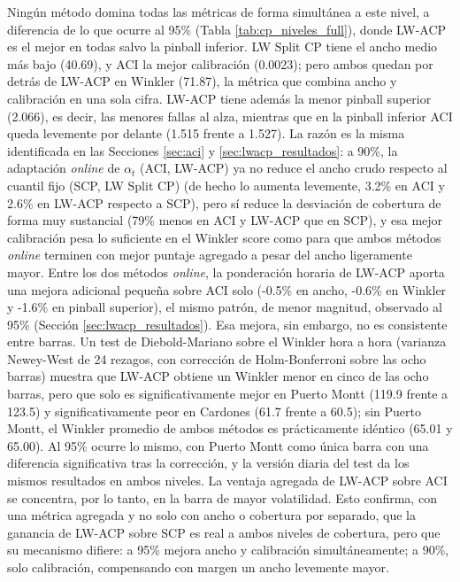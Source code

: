 Ningún método domina todas las métricas de forma simultánea a este nivel, a diferencia de lo que ocurre al 95\% (Tabla \ref{tab:cp_niveles_full}), donde LW-ACP es el mejor en todas salvo la pinball inferior. LW Split CP tiene el ancho medio más bajo (40.69), y ACI la mejor calibración (0.0023); pero ambos quedan por detrás de LW-ACP en Winkler (71.87), la métrica que combina ancho y calibración en una sola cifra. LW-ACP tiene además la menor pinball superior (2.066), es decir, las menores fallas al alza, mientras que en la pinball inferior ACI queda levemente por delante (1.515 frente a 1.527). La razón es la misma identificada en las Secciones \ref{sec:aci} y \ref{sec:lwacp_resultados}: a 90\%, la adaptación \textit{online} de $\alpha_t$ (ACI, LW-ACP) ya no reduce el ancho crudo respecto al cuantil fijo (SCP, LW Split CP) (de hecho lo aumenta levemente, 3.2\% en ACI y 2.6\% en LW-ACP respecto a SCP), pero sí reduce la desviación de cobertura de forma muy sustancial (79\% menos en ACI y LW-ACP que en SCP), y esa mejor calibración pesa lo suficiente en el Winkler score como para que ambos métodos \textit{online} terminen con mejor puntaje agregado a pesar del ancho ligeramente mayor. Entre los dos métodos \textit{online}, la ponderación horaria de LW-ACP aporta una mejora adicional pequeña sobre ACI solo (-0.5\% en ancho, -0.6\% en Winkler y -1.6\% en pinball superior), el mismo patrón, de menor magnitud, observado al 95\% (Sección \ref{sec:lwacp_resultados}). Esa mejora, sin embargo, no es consistente entre barras. Un test de Diebold-Mariano sobre el Winkler hora a hora (varianza Newey-West de 24 rezagos, con corrección de Holm-Bonferroni sobre las ocho barras) muestra que LW-ACP obtiene un Winkler menor en cinco de las ocho barras, pero que solo es significativamente mejor en Puerto Montt (119.9 frente a 123.5) y significativamente peor en Cardones (61.7 frente a 60.5); sin Puerto Montt, el Winkler promedio de ambos métodos es prácticamente idéntico (65.01 y 65.00). Al 95\% ocurre lo mismo, con Puerto Montt como única barra con una diferencia significativa tras la corrección, y la versión diaria del test da los mismos resultados en ambos niveles. La ventaja agregada de LW-ACP sobre ACI se concentra, por lo tanto, en la barra de mayor volatilidad. Esto confirma, con una métrica agregada y no solo con ancho o cobertura por separado, que la ganancia de LW-ACP sobre SCP es real a ambos niveles de cobertura, pero que su mecanismo difiere: a 95\% mejora ancho y calibración simultáneamente; a 90\%, solo calibración, compensando con margen un ancho levemente mayor.

